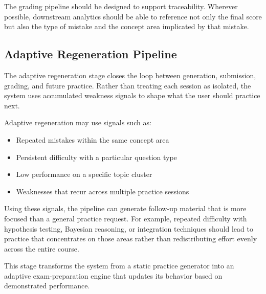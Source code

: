 \documentclass[11pt]{article}
\begin{document}
The grading pipeline should be designed to support traceability. Wherever possible, downstream analytics should be able to reference not only the final score but also the type of mistake and the concept area implicated by that mistake.

\subsection{Adaptive Regeneration Pipeline}
The adaptive regeneration stage closes the loop between generation, submission, grading, and future practice. Rather than treating each session as isolated, the system uses accumulated weakness signals to shape what the user should practice next.

Adaptive regeneration may use signals such as:
\begin{itemize}
\item Repeated mistakes within the same concept area
\item Persistent difficulty with a particular question type
\item Low performance on a specific topic cluster
\item Weaknesses that recur across multiple practice sessions
\end{itemize}

Using these signals, the pipeline can generate follow-up material that is more focused than a general practice request. For example, repeated difficulty with hypothesis testing, Bayesian reasoning, or integration techniques should lead to practice that concentrates on those areas rather than redistributing effort evenly across the entire course.

This stage transforms the system from a static practice generator into an adaptive exam-preparation engine that updates its behavior based on demonstrated performance.
\end{document}
